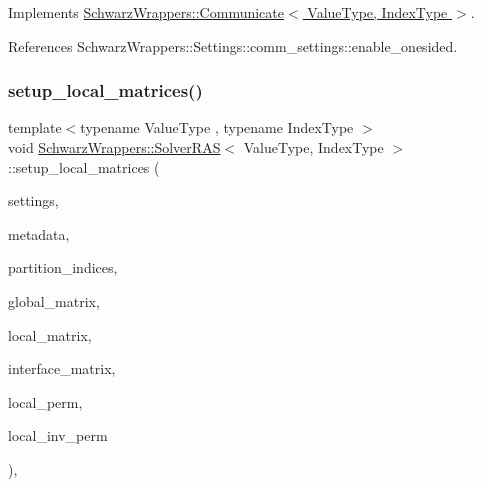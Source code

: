 Implements \hyperlink{classSchwarzWrappers_1_1Communicate_af6ef7b0a4d98427c8c0ea4f4244b08d1}{Schwarz\+Wrappers\+::\+Communicate$<$ Value\+Type, Index\+Type $>$}.



References Schwarz\+Wrappers\+::\+Settings\+::comm\+\_\+settings\+::enable\+\_\+onesided.

\mbox{\label{classSchwarzWrappers_1_1SolverRAS_ab44245cb5dede72cd11502cf59593626}} 
\subsubsection{\texorpdfstring{setup\+\_\+local\+\_\+matrices()}{setup\_local\_matrices()}}
{\footnotesize\ttfamily template$<$typename Value\+Type , typename Index\+Type $>$ \\
void \hyperlink{classSchwarzWrappers_1_1SolverRAS}{Schwarz\+Wrappers\+::\+Solver\+R\+AS}$<$ Value\+Type, Index\+Type $>$\+::setup\+\_\+local\+\_\+matrices (\begin{DoxyParamCaption}\item[{\hyperlink{structSchwarzWrappers_1_1Settings}{Settings} \&}]{settings,  }\item[{\hyperlink{structSchwarzWrappers_1_1Metadata}{Metadata}$<$ Value\+Type, Index\+Type $>$ \&}]{metadata,  }\item[{std\+::vector$<$ unsigned int $>$ \&}]{partition\+\_\+indices,  }\item[{std\+::shared\+\_\+ptr$<$ gko\+::matrix\+::\+Csr$<$ Value\+Type, Index\+Type $>$$>$ \&}]{global\+\_\+matrix,  }\item[{std\+::shared\+\_\+ptr$<$ gko\+::matrix\+::\+Csr$<$ Value\+Type, Index\+Type $>$$>$ \&}]{local\+\_\+matrix,  }\item[{std\+::shared\+\_\+ptr$<$ gko\+::matrix\+::\+Csr$<$ Value\+Type, Index\+Type $>$$>$ \&}]{interface\+\_\+matrix,  }\item[{std\+::shared\+\_\+ptr$<$ gko\+::matrix\+::\+Permutation$<$ Index\+Type $>$$>$ \&}]{local\+\_\+perm,  }\item[{std\+::shared\+\_\+ptr$<$ gko\+::matrix\+::\+Permutation$<$ Index\+Type $>$$>$ \&}]{local\+\_\+inv\+\_\+perm }\end{DoxyParamCaption})\hspace{0.3cm}{\ttfamily [override]}, {\ttfamily [virtual]}}



